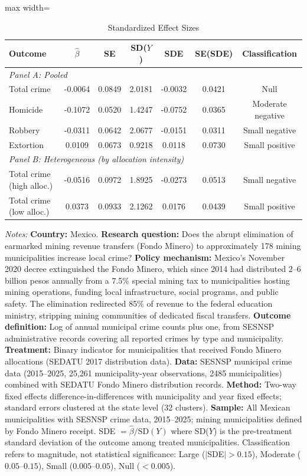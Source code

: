 \begin{table}[H]
\centering
\caption{Standardized Effect Sizes}
\label{tab:sde}
\begin{adjustbox}{max width=\textwidth}
\begin{threeparttable}
\begin{tabular}{l cccccc}
\toprule
Outcome & $\hat{\beta}$ & SE & SD($Y$) & SDE & SE(SDE) & Classification \\
\midrule
\multicolumn{7}{l}{\textit{Panel A: Pooled}} \\
Total crime & -0.0064 & 0.0849 & 2.0181 & -0.0032 & 0.0421 & Null \\
Homicide & -0.1072 & 0.0520 & 1.4247 & -0.0752 & 0.0365 & Moderate negative \\
Robbery & -0.0311 & 0.0642 & 2.0677 & -0.0151 & 0.0311 & Small negative \\
Extortion & 0.0109 & 0.0673 & 0.9218 & 0.0118 & 0.0730 & Small positive \\
\midrule
\multicolumn{7}{l}{\textit{Panel B: Heterogeneous (by allocation intensity)}} \\
Total crime (high alloc.) & -0.0516 & 0.0972 & 1.8925 & -0.0273 & 0.0513 & Small negative \\
Total crime (low alloc.) & 0.0373 & 0.0933 & 2.1262 & 0.0176 & 0.0439 & Small positive \\
\bottomrule
\end{tabular}
\begin{tablenotes}[flushleft]\footnotesize
\item \textit{Notes:} \textbf{Country:} Mexico. \textbf{Research question:} Does the abrupt elimination of earmarked mining revenue transfers (Fondo Minero) to approximately 178 mining municipalities increase local crime? \textbf{Policy mechanism:} Mexico's November 2020 decree extinguished the Fondo Minero, which since 2014 had distributed 2--6 billion pesos annually from a 7.5\% special mining tax to municipalities hosting mining operations, funding local infrastructure, social programs, and public safety. The elimination redirected 85\% of revenue to the federal education ministry, stripping mining communities of dedicated fiscal transfers. \textbf{Outcome definition:} Log of annual municipal crime counts plus one, from SESNSP administrative records covering all reported crimes by type and municipality. \textbf{Treatment:} Binary indicator for municipalities that received Fondo Minero allocations (SEDATU 2017 distribution data). \textbf{Data:} SESNSP municipal crime data (2015--2025, 25,261 municipality-year observations, 2485 municipalities) combined with SEDATU Fondo Minero distribution records. \textbf{Method:} Two-way fixed effects difference-in-differences with municipality and year fixed effects; standard errors clustered at the state level (32 clusters). \textbf{Sample:} All Mexican municipalities with SESNSP crime data, 2015--2025; mining municipalities defined by Fondo Minero receipt. SDE $= \hat{\beta} / \text{SD}(Y)$ where SD($Y$) is the pre-treatment standard deviation of the outcome among treated municipalities. Classification refers to magnitude, not statistical significance: Large ($|$SDE$| > 0.15$), Moderate ($0.05$--$0.15$), Small ($0.005$--$0.05$), Null ($< 0.005$).

\end{tablenotes}
\end{threeparttable}
\end{adjustbox}
\end{table}
